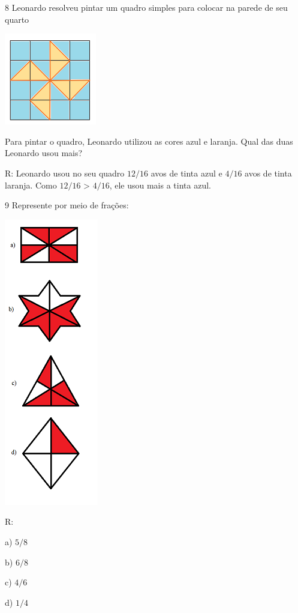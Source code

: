 \num{8}  Leonardo resolveu pintar um quadro simples para colocar na parede de
seu quarto

\includegraphics[width=1.58333in,height=1.57292in]{./imgSAEB_6_MAT/media/image33.png}

Para pintar o quadro, Leonardo utilizou as cores azul e laranja. Qual
das duas Leonardo usou mais?

R: Leonardo usou no seu quadro $12/16$ avos de tinta azul e $4/16$ avos de
tinta laranja. Como $12/16$ \textgreater{} $4/16$, ele usou mais a tinta
azul.

\num{9}  Represente por meio de frações:

\includegraphics[width=1.61458in,height=4.94792in]{./imgSAEB_6_MAT/media/image34.png}

R:

a) $5/8$

b) $6/8$

c) $4/6$

d) $1/4$

